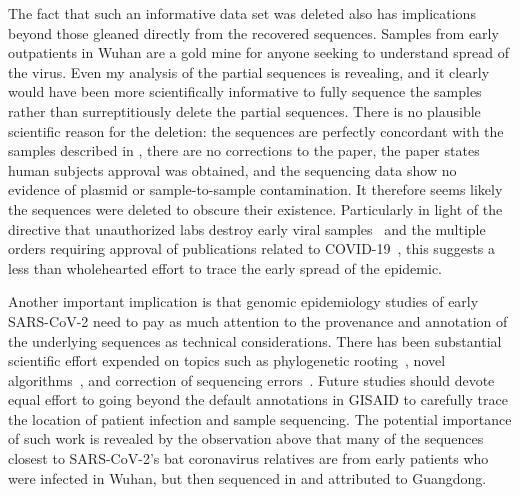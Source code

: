 \documentclass[9pt,twocolumn,twoside]{gsajnl_modified}
\begin{document}
The fact that such an informative data set was deleted also has implications beyond those gleaned directly from the recovered sequences.
Samples from early outpatients in Wuhan are a gold mine for anyone seeking to understand spread of the virus.
Even my analysis of the partial sequences is revealing, and it clearly would have been more scientifically informative to fully sequence the samples rather than surreptitiously delete the partial sequences.
There is no plausible scientific reason for the deletion: the sequences are perfectly concordant with the samples described in \citet{wang2020medRxiv,wang2020small}, there are no corrections to the paper, the paper states human subjects approval was obtained, and the sequencing data show no evidence of plasmid or sample-to-sample contamination.
It therefore seems likely the sequences were deleted to obscure their existence.
Particularly in light of the directive that unauthorized labs destroy early viral samples~\citep{pinghui2020SCMP} and the multiple orders requiring approval of publications related to COVID-19~\citep{chinacdc2020, Kang2020}, this suggests a less than wholehearted effort to trace the early spread of the epidemic.

Another important implication is that genomic epidemiology studies of early SARS-CoV-2 need to pay as much attention to the provenance and annotation of the underlying sequences as technical considerations.
There has been substantial scientific effort expended on topics such as phylogenetic rooting~\citep{pipes2021assessing, morel2021phylogenetic}, novel algorithms~\citep{kumar2021evolutionary}, and correction of sequencing errors~\citep{turakhia2020stability}.
Future studies should devote equal effort to going beyond the default annotations in GISAID to carefully trace the location of patient infection and sample sequencing.
The potential importance of such work is revealed by the observation above that many of the sequences closest to SARS-CoV-2's bat coronavirus relatives are from early patients who were infected in Wuhan, but then sequenced in and attributed to Guangdong.
\end{document}
